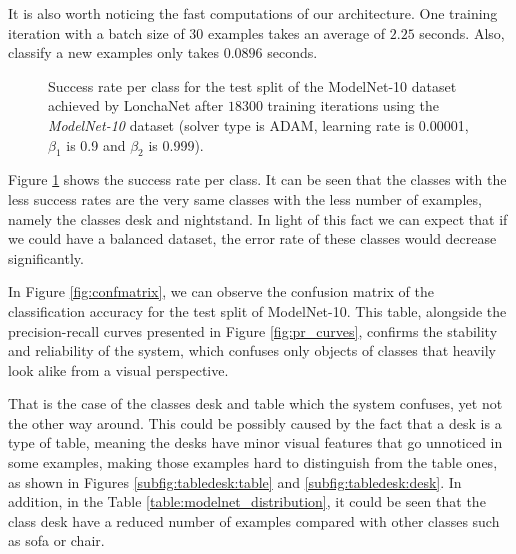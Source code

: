 It is also worth noticing the fast computations of our architecture. One training iteration with a batch size of $30$ examples takes an average of $2.25$ seconds. Also, classify a new examples only takes $0.0896$ seconds.

\begin{figure}[!b]
	\centering
	\caption{Success rate per class for the test split of the ModelNet-10 dataset achieved by LonchaNet after $18300$ training iterations using the \emph{ModelNet-10} dataset (solver type is ADAM, learning rate is 0.00001, $\beta_1$ is 0.9 and $\beta_2$ is 0.999).}
	\label{fig:success_per_class}
\end{figure}


Figure \ref{fig:success_per_class} shows the success rate per class. It can be seen that the classes with the less success rates are the very same classes with the less number of examples, namely the classes desk and nightstand. In light of this fact we can expect that if we could have a balanced dataset, the error rate of these classes would decrease significantly.

In Figure \ref{fig:confmatrix}, we can observe the confusion matrix of the classification accuracy for the test split of ModelNet-10. This table, alongside the precision-recall curves presented in Figure \ref{fig:pr_curves}, confirms the stability and reliability of the system, which confuses only objects of classes that heavily look alike from a visual perspective.

That is the case of the classes desk and table which the system confuses, yet not the other way around. This could be possibly caused by the fact that a desk is a type of table, meaning the desks have minor visual features that go unnoticed in some examples, making those examples hard to distinguish from the table ones, as shown in Figures \ref{subfig:tabledesk:table} and \ref{subfig:tabledesk:desk}.
In addition, in the Table \ref{table:modelnet_distribution}, it could be seen that the class desk have a reduced number of examples compared with other classes such as sofa or chair.

